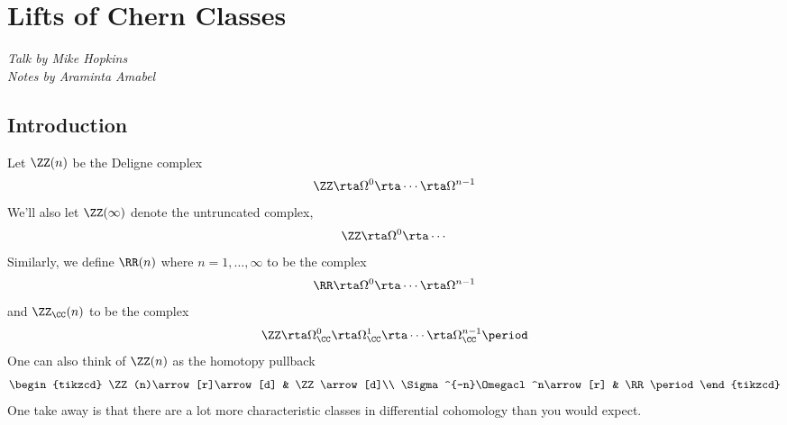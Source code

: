 
\section{Lifts of Chern Classes}\label{LiftsofChernClasses}
\textit{Talk by Mike Hopkins}\\
\textit{Notes by Araminta Amabel}


\subsection{Introduction}

Let $\ZZ(n)$ be the Deligne complex  
\begin{equation*}
	\ZZ\rta\Omega^0\rta\cdots\rta \Omega^{n-1}
\end{equation*}
We'll also let $\ZZ(\infty)$ denote the untruncated complex,
\begin{equation*}
	\ZZ\rta\Omega^0\rta\cdots
\end{equation*}
Similarly, we define $\RR(n)$ where $n=1,\dots,\infty$ to be the complex  
\begin{equation*}
	\RR\rta\Omega^0\rta\cdots\rta \Omega^{n-1}
\end{equation*}
and $\ZZ_\CC(n)$ to be the complex  
\begin{equation*}
	\ZZ\rta\Omega^0_\CC\rta\Omega^1_\CC\rta\cdots\rta\Omega^{n-1}_\CC \period
\end{equation*}
One can also think of $\ZZ(n)$ as the homotopy pullback
\begin{equation*}
	\begin{tikzcd}
		\ZZ(n)\arrow[r]\arrow[d] & \ZZ\arrow[d]\\
		\Sigma^{-n}\Omegacl^n\arrow[r] & \RR \period
	\end{tikzcd}
\end{equation*}
One take away is that there are a lot more characteristic classes in differential cohomology than you would expect.

